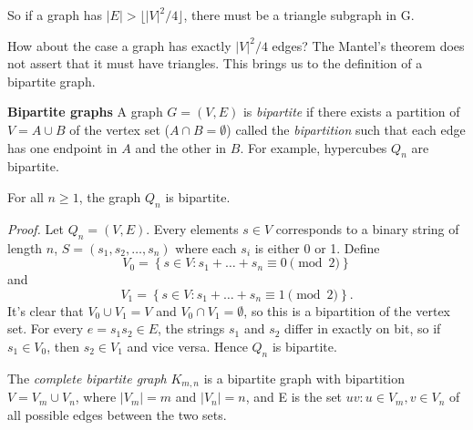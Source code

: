 \documentclass{tufte-handout}
\begin{document}
So if a graph has \(\left|E\right| > \lfloor \left|V\right|^2\slash 4 \rfloor \), there must be a triangle subgraph in G.

How about the case a graph has exactly \(\left|V\right|^2\slash 4 \) edges? 
The Mantel's theorem does not assert that it must have triangles.
This brings us to the definition of a bipartite graph.

\textbf{Bipartite graphs} A graph \( G = (V,E) \) is \textit{bipartite} if there exists
a partition of \( V = A \cup B \) of the vertex set (\( A\cap B = \emptyset\)) called the \textit{bipartition}
such that each edge has one endpoint in \( A \) and the other in \( B \).
For example, hypercubes \( Q_n \) are bipartite.

\begin{Proposition}
    For all \( n \geq 1 \), the graph \( Q_n \) is bipartite.
\end{Proposition}
\textit{Proof.} Let \( Q_n = (V,E) \). Every elements \( s\in V \) corresponds to a binary string of length \( n \),
\( S = (s_1, s_2, \ldots, s_n) \) where each \( s_i \) is either 0 or 1. Define
\[V_0 = \left\{s\in V: s_1 + \dots + s_n \equiv 0 \pmod 2\right\}\]
and
\[V_1 = \left\{s\in V: s_1 + \dots + s_n \equiv 1 \pmod 2\right\}.\]
It's clear that \( V_0 \cup V_1 =V \) and \( V_0 \cap V_1 = \emptyset \), so this is a bipartition of the vertex set.
For every \( e = s_1s_2 \in E \), the strings \( s_1 \) and \( s_2 \) differ in exactly on bit, so if
\( s_1 \in V_0 \), then \( s_2 \in V_1 \) and vice versa. Hence \( Q_n \) is bipartite. \qedsymbol

The \textit{complete bipartite graph} \( K_{m,n} \) is a bipartite graph with bipartition \( V = V_m \cup V_n \), where
\( \left|V_m\right| = m \) and \( \left|V_n\right| = n \), and E is the set \( {uv: u\in V_m, v\in V_n} \) of
all possible edges between the two sets.
\end{document}
